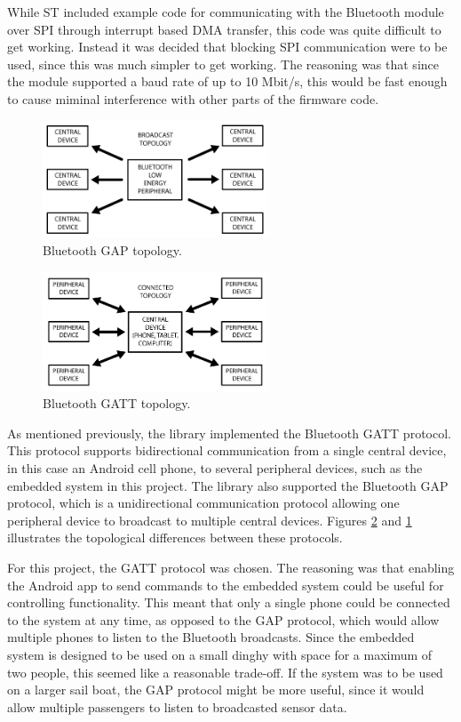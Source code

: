 While ST included example code for communicating with the Bluetooth module over SPI through interrupt based DMA transfer, this code was quite difficult to get working. Instead it was decided that blocking SPI communication were to be used, since this was much simpler to get working. The reasoning was that since the module supported a baud rate of up to 10 Mbit/s, this would be fast enough to cause miminal interference with other parts of the firmware code.

\begin{figure}[H]
\centering
\includegraphics[width=0.6\textwidth]{Figures/bt_gap.png}
\caption{Bluetooth GAP topology.}
\label{bt-gap}
\end{figure}

\begin{figure}[H]
\centering
\includegraphics[width=0.6\textwidth]{Figures/bt_gatt.png}
\caption{Bluetooth GATT topology.}
\label{bt-gatt}
\end{figure}

As mentioned previously, the library implemented the Bluetooth GATT protocol. This protocol supports bidirectional communication from a single central device, in this case an Android cell phone, to several peripheral devices, such as the embedded system in this project. The library also supported the Bluetooth GAP protocol, which is a unidirectional communication protocol allowing one peripheral device to broadcast to multiple central devices. Figures \ref{bt-gatt} and \ref{bt-gap} illustrates the topological differences between these protocols.

For this project, the GATT protocol was chosen. The reasoning was that enabling the Android app to send commands to the embedded system could be useful for controlling functionality. This meant that only a single phone could be connected to the system at any time, as opposed to the GAP protocol, which would allow multiple phones to listen to the Bluetooth broadcasts. Since the embedded system is designed to be used on a small dinghy with space for a maximum of two people, this seemed like a reasonable trade-off. If the system was to be used on a larger sail boat, the GAP protocol might be more useful, since it would allow multiple passengers to listen to broadcasted sensor data.

